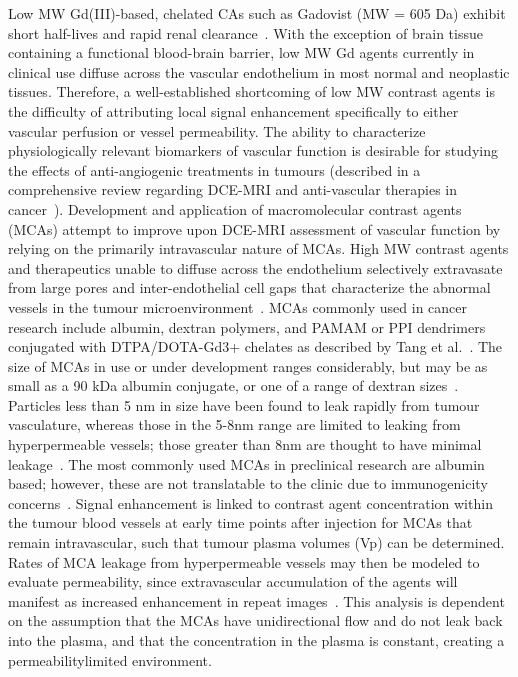 Low \ac{MW} Gd(III)-based, chelated \ac{CA}s such as Gadovist (MW = 605 Da) exhibit short half-lives and rapid renal clearance~\cite{Weinmann:1984gv}.
With the exception of brain tissue containing a functional blood-brain barrier, low MW Gd agents currently in clinical use diffuse across the vascular endothelium in most normal and neoplastic tissues.
Therefore, a well-established shortcoming of low MW contrast agents is the difficulty of attributing local signal enhancement specifically to either vascular perfusion or vessel permeability.
The ability to characterize physiologically relevant biomarkers of vascular function is desirable for studying the effects of anti-angiogenic treatments in tumours (described in a comprehensive review regarding DCE-MRI and anti-vascular therapies in cancer~\cite{OConnor:2012iea}).
Development and application of macromolecular contrast agents (MCAs) attempt to improve upon DCE-MRI assessment of vascular function by relying on the primarily intravascular nature of \ac{MCA}s.
High MW contrast agents and therapeutics unable to diffuse across the endothelium selectively extravasate from large pores and inter-endothelial cell gaps that characterize the abnormal vessels in the tumour microenvironment~\cite{McDonald:2002ut,Hashizume:2000bq}.
MCAs commonly used in cancer research include albumin, dextran polymers, and PAMAM or PPI dendrimers conjugated with DTPA/DOTA-Gd3+ chelates as described by Tang et al.~\cite{Tang:2013fi}.
The size of \ac{MCA}s in use or under development ranges considerably, but may be as small as a 90 kDa albumin conjugate, or one of a range of dextran sizes~\cite{Barrett:2006jx}.
Particles less than 5 nm in size have been found to leak rapidly from tumour vasculature, whereas those in the 5-8nm range are limited to leaking from hyperpermeable vessels; those greater than 8nm are thought to have minimal leakage~\cite{Kobayashi:2004vq,Sato:2001tt}.
The most commonly used \ac{MCA}s in preclinical research are albumin based; however, these are not translatable to the clinic due to immunogenicity concerns~\cite{Ogan:1987tg}.
Signal enhancement is linked to contrast agent concentration within the tumour blood vessels at early time points after injection for \ac{MCA}s that remain intravascular, such that tumour plasma volumes (Vp) can be determined.
Rates of \ac{MCA} leakage from hyperpermeable vessels may then be modeled to evaluate permeability, since extravascular accumulation of the agents will manifest as increased enhancement in repeat images~\cite{Ogan:1987tg,Turetschek:2004bw}.
This analysis is dependent on the assumption that the \ac{MCA}s have unidirectional flow and do not leak back into the plasma, and that the concentration in the plasma is constant, creating a permeabilitylimited environment.

